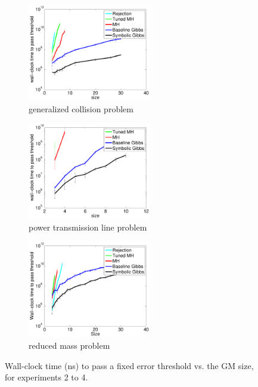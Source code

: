 \documentclass[letterpaper]{article}
\begin{document}
\begin{figure}
\begin{center}
\begin{subfigure}[b]{0.33\textwidth}
 \includegraphics[width=1\linewidth, height=120pt]{Figs/plots/collision/time_vs_param-errorbar.pdf}
\caption{generalized collision problem}
\label{fig:err-threshold-vs-size-collision}
\end{subfigure}
%
\begin{subfigure}[b]{0.33\textwidth}
\includegraphics[width=1\linewidth, height=120pt]{Figs/plots/fermentation/time_vs_param-errorbar.pdf}
\caption{power transmission line problem}
\label{fig:err-threshold-vs-size-alc}
\end{subfigure}
\begin{subfigure}[b]{0.33\textwidth}
\includegraphics[width=1\linewidth, height=120pt]{Figs/plots/circuits/time_vs_param-errorbar.pdf}
\caption{reduced mass problem}
\label{fig:err-threshold-vs-size-circuit}
\end{subfigure}
\end{center}
\caption{Wall-clock time (ns) to pass a fixed error threshold vs. the GM size, for experiments 2 to 4.}
\end{figure}
\end{document}
